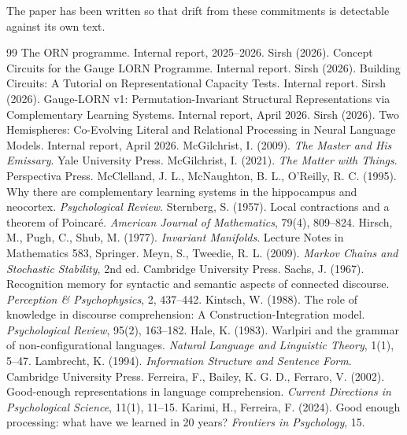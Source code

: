 \documentclass[10pt, twocolumn, a4paper]{article}
\begin{document}
The paper has been written so that drift from these commitments is detectable against its own text.


\begin{thebibliography}{99}
 The ORN programme. Internal report, 2025--2026.
 Sirsh (2026). Concept Circuits for the Gauge LORN Programme. Internal report.
 Sirsh (2026). Building Circuits: A Tutorial on Representational Capacity Tests. Internal report.
 Sirsh (2026). Gauge-LORN v1: Permutation-Invariant Structural Representations via Complementary Learning Systems. Internal report, April 2026.
 Sirsh (2026). Two Hemispheres: Co-Evolving Literal and Relational Processing in Neural Language Models. Internal report, April 2026.
 McGilchrist, I. (2009). \emph{The Master and His Emissary}. Yale University Press.
 McGilchrist, I. (2021). \emph{The Matter with Things}. Perspectiva Press.
 McClelland, J. L., McNaughton, B. L., O'Reilly, R. C. (1995). Why there are complementary learning systems in the hippocampus and neocortex. \emph{Psychological Review}.
 Sternberg, S. (1957). Local contractions and a theorem of Poincar\'{e}. \emph{American Journal of Mathematics}, 79(4), 809--824.
 Hirsch, M., Pugh, C., Shub, M. (1977). \emph{Invariant Manifolds}. Lecture Notes in Mathematics 583, Springer.
 Meyn, S., Tweedie, R. L. (2009). \emph{Markov Chains and Stochastic Stability}, 2nd ed. Cambridge University Press.
 Sachs, J. (1967). Recognition memory for syntactic and semantic aspects of connected discourse. \emph{Perception \& Psychophysics}, 2, 437--442.
 Kintsch, W. (1988). The role of knowledge in discourse comprehension: A Construction-Integration model. \emph{Psychological Review}, 95(2), 163--182.
 Hale, K. (1983). Warlpiri and the grammar of non-configurational languages. \emph{Natural Language and Linguistic Theory}, 1(1), 5--47.
 Lambrecht, K. (1994). \emph{Information Structure and Sentence Form}. Cambridge University Press.
 Ferreira, F., Bailey, K. G. D., Ferraro, V. (2002). Good-enough representations in language comprehension. \emph{Current Directions in Psychological Science}, 11(1), 11--15.
 Karimi, H., Ferreira, F. (2024). Good enough processing: what have we learned in 20 years? \emph{Frontiers in Psychology}, 15.

\end{thebibliography}
\end{document}

